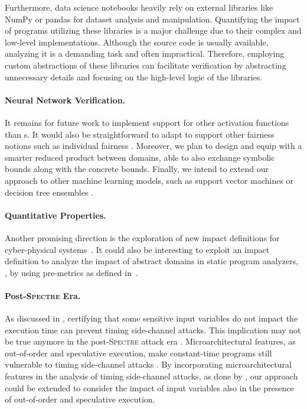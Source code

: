 Furthermore, data science notebooks heavily rely on external libraries like NumPy or pandas for dataset analysis and manipulation. Quantifying the impact of programs utilizing these libraries is a major challenge due to their complex and low-level implementations. Although the source code is usually available, analyzing it is a demanding task and often impractical. Therefore, employing custom abstractions of these libraries can facilitate verification by abstracting unnecessary details and focusing on the high-level logic of the libraries.

\paragraph{Neural Network Verification.}

It remains for future work to implement support for other activation functions than \relu s. It would also be straightforward to adapt \libra{} to support other fairness notions such as individual fairness .
%
Moreover, we plan to design and equip \libra{} with a smarter reduced product between domains, able to also exchange symbolic bounds along with the concrete bounds.
%
Finally, we intend to extend our approach to other machine learning models, such as support vector machines  or decision tree ensembles .


\paragraph{Quantitative Properties.}

Another promising direction is the exploration of new impact definitions for cyber-physical systems~.
It could also be interesting to exploit an impact definition to analyze the impact of abstract domains in static program analyzers, \eg, by using pre-metrics as defined in~.

\paragraph{Post-\textsc{Spectre} Era.}

As discussed in , certifying that some sensitive input variables do not impact the execution time can prevent timing side-channel attacks.
This implication may not be true anymore in the post-\textsc{Spectre} attack era .
Microarchitectural features, as out-of-order and speculative execution, make constant-time programs still vulnerable to timing side-channel attacks .
By incorporating microarchitectural features in the analysis of timing side-channel attacks, as done by , our approach could be extended to consider the impact of input variables also in the presence of out-of-order and speculative execution.
